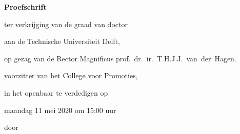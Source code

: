 \begin{titlepage}

\begin{center}

\vspace*{2\bigskipamount}

{\makeatletter
\titlestyle\bfseries\LARGE\@title
\makeatother}

{\makeatletter
\ifx\@subtitle\undefined\else
    \bigskip
    \titlefont\titleshape\Large\@subtitle
\fi
\makeatother}

\end{center}

\cleardoublepage
\thispagestyle{empty}

\begin{center}


\vspace*{2\bigskipamount}

{\makeatletter
\titlestyle\bfseries\LARGE\@title
\makeatother}

{\makeatletter
\ifx\@subtitle\undefined\else
    \bigskip
    \titlefont\titleshape\Large\@subtitle
\fi
\makeatother}

\vfill


{\Large\titlefont\bfseries Proefschrift}

\bigskip
\bigskip

ter verkrijging van de graad van doctor

aan de Technische Universiteit Delft,

op gezag van de Rector Magnificus prof.~dr.~ir.~T.H.J.J.~van~der~Hagen.

voorzitter van het College voor Promoties,

in het openbaar te verdedigen op

maandag 11 mei 2020 om 15:00 uur

\bigskip
\bigskip

door

\bigskip
\bigskip

\makeatletter
{\Large\titlefont\bfseries\@firstname\ {\titleshape\@lastname}}
\makeatother


\end{center}
\end{titlepage}
